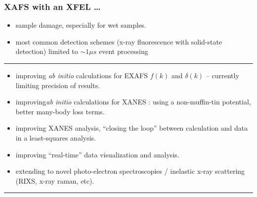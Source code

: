 \begin{frame} \frametitle{XAFS with an XFEL \ldots }
  \small
  \begin{cenpage}{100mm}\setlength{\baselineskip}{11pt}
    \vspace{1mm}

    
    {}

    \begin{itemize}
    \item sample damage, especially for wet samples.
    \item most common detection schemes (x-ray fluorescence with
      solid-state detection) limited to $\sim 1 \mu s$ event processing
    \end{itemize}
   
    \vmm \hrule \vmm
           
    {}
    
    \begin{itemize}
    \item improving {\emph{ab initio}} calculations for EXAFS $f(k)$ and
      $\delta(k)$ -- currently limiting precision of results.

    \item improving{\emph{ab initio}} calculations for XANES : using a
      non-muffin-tin potential, better many-body loss terms.
      
    \item improving XANES analysis, ``closing the loop'' between calculation
      and data in a least-squares analysis.

    \item improving ``real-time'' data visualization and analysis.
      
    \item extending to novel photo-electron spectroscopies / inelastic
      x-ray scattering  (RIXS, x-ray raman, etc).

    \end{itemize}

    \vmm \hrule \vmm
    
  \end{cenpage}

\vfill
\end{frame} 
